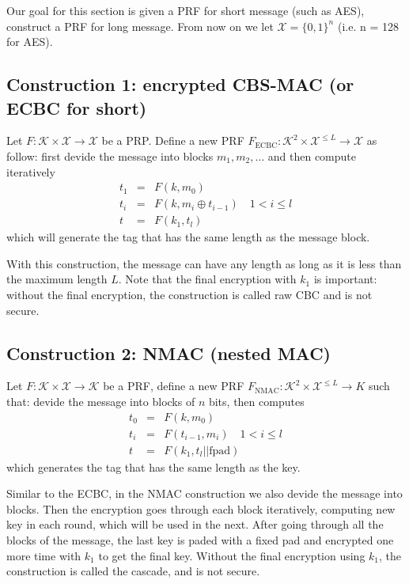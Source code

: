 \documentclass{article}
\begin{document}
Our goal for this section is given a PRF for short message (such as AES),
construct a PRF for long message. From now on we let $\mathcal{X} = \lbrace 0, 1
\rbrace^n$ (i.e. n = 128 for AES).

\subsection{Construction 1: encrypted CBS-MAC (or ECBC for short)}

Let $F: \mathcal{K} \times \mathcal{X} \to \mathcal{X}$ be a PRP. Define a new
PRF $F_\text{ECBC}: \mathcal{K}^2 \times \mathcal{X}^{\le L} \to \mathcal{X}$ as
follow: first devide the message into blocks $m_1, m_2, \dotsc$ and then compute
iteratively 
\begin{eqnarray}
  t_1 &=& F(k, m_0) \\
  t_i &=& F(k, m_i \oplus t_{i-1}) \quad 1 < i \le l \\
  t &=& F(k_1, t_l)
\end{eqnarray}
which will generate the tag that has the same length as the message block.

With this construction, the message can have any length as long as it is less
than the maximum length $L$. Note that the final encryption with $k_1$ is
important: without the final encryption, the construction is called raw CBC and
is not secure.

\subsection{Construction 2: NMAC (nested MAC)}

Let $F: \mathcal{K} \times \mathcal{X} \to \mathcal{K}$ be a PRF, define a new
PRF $F_\text{NMAC}: \mathcal{K}^2 \times \mathcal{X}^{\le L} \to K$ such that:
devide the message into blocks of $n$ bits, then computes
\begin{eqnarray}
  t_0 &=& F(k, m_0) \\
  t_i &=& F(t_{i-1}, m_i) \quad 1 < i \le l\\
  t &=& F(k_1, t_l || \text{fpad})
\end{eqnarray}
which generates the tag that has the same length as the key.

Similar to the ECBC, in the NMAC construction we also devide the message into
blocks. Then the encryption goes through each block iteratively, computing new
key in each round, which will be used in the next. After going through all the
blocks of the message, the last key is paded with a fixed pad and encrypted one
more time with $k_1$ to get the final key. Without the final encryption using
$k_1$, the construction is called the cascade, and is not secure.
\end{document}
